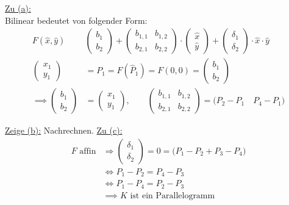 \begin{lösung}
	\underline{Zu (a):}\\
	Bilinear bedeutet von folgender Form:
	\begin{align*}
		F(\hat{x},\hat{y})&\begin{pmatrix}
			b_1\\ 
			b_2
		\end{pmatrix}
		+\begin{pmatrix}
			b_{1,1} & b_{1,2}\\
			b_{2,1} & b_{2,2}
		\end{pmatrix}\cdot\begin{pmatrix}
			\hat{x}\\
			\hat{y}
		\end{pmatrix}+\begin{pmatrix}
			\delta_1\\
			\delta_2
		\end{pmatrix}\cdot\hat{x}\cdot\hat{y}\\
		\begin{pmatrix}
			x_1\\ 
			y_1
		\end{pmatrix}
		&=P_1=F(\hat{P}_1)=F(0,0)=\begin{pmatrix}
			b_1\\ 
			b_2
		\end{pmatrix}\\
		\implies
		\begin{pmatrix}
			b_1\\ 
			b_2
		\end{pmatrix}&=
		\begin{pmatrix}
			x_1\\ 
			y_1
		\end{pmatrix},\qquad\begin{pmatrix}
			b_{1,1} & b_{1,2}\\
			b_{2,1} & b_{2,2}
		\end{pmatrix}=\Big ( P_2-P_1\quad P_4-P_1  \Big )
	\end{align*}

	\underline{Zeige (b):} Nachrechnen.\nl
	\underline{Zu (c):}
	\begin{align*}
		F\text{ affin}&\Longrightarrow\begin{pmatrix}
		\delta_1\\\delta_2
		\end{pmatrix}=0=\Big (P_1-P_2+P_3-P_4\Big )\\
		&\Longleftrightarrow P_1-P_2=P_4-P_3\\
		&\Longleftrightarrow P_1-P_4=P_2-P_3\\
		&\implies K\text{ ist ein Parallelogramm}
	\end{align*}
\end{lösung}

